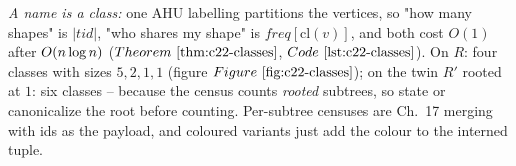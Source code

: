 \begin{recallbox}
\emph{A name is a class:} one AHU labelling partitions the vertices, so
"how many shapes" is \(|\mathit{tid}|\), "who shares my shape" is
\(\mathit{freq}[\mathrm{cl}(v)]\), and both cost \(O(1)\) after
\(O(n\log n)\) (\(\thmref{c22-classes}\), \(\coderef{c22-classes}\)).  On \(R\):
four classes with sizes \(5,2,1,1\) (figure \(\figref{c22-classes}\)); on the twin
\(R'\) rooted at \(1\): six classes -- because the census counts \emph{rooted}
subtrees, so state or canonicalize the root before counting.  Per-subtree
censuses are Ch.~17 merging with ids as the payload, and coloured variants just
add the colour to the interned tuple.
\end{recallbox}

